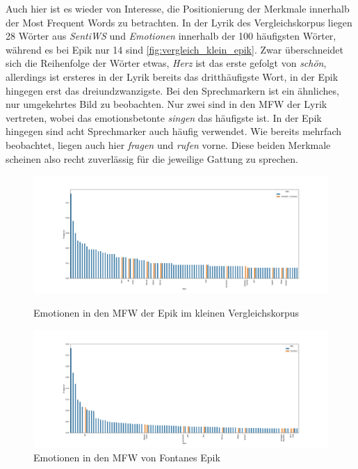 \documentclass[a4paper,10p]{article}
\begin{document}
Auch hier ist es wieder von Interesse, die Positionierung der Merkmale innerhalb der Most Frequent Words zu betrachten. In der Lyrik des Vergleichskorpus liegen 28 Wörter aus \textit{SentiWS} und \textit{Emotionen} innerhalb der 100 häufigsten Wörter, während es bei Epik nur 14 sind \ref{fig:vergleich_klein_epik}. Zwar überschneidet sich die Reihenfolge der Wörter etwas, \textit{Herz} ist das erste gefolgt von \textit{schön}, allerdings ist ersteres in der Lyrik bereits das dritthäufigste Wort, in der Epik hingegen erst das dreiundzwanzigste. Bei den Sprechmarkern ist ein ähnliches, nur umgekehrtes Bild zu beobachten. Nur zwei sind in den MFW der Lyrik vertreten, wobei das emotionsbetonte \textit{singen} das häufigste ist. In der Epik hingegen sind acht Sprechmarker auch häufig verwendet. Wie bereits mehrfach beobachtet, liegen auch hier \textit{fragen} und \textit{rufen} vorne. Diese beiden Merkmale scheinen also recht zuverlässig für die jeweilige Gattung zu sprechen. \par 

\begin{figure}{}
	\centering
	\begin{minipage}[b]{.45\linewidth}
		\centering
		\includegraphics[width=\linewidth]{vergleich_epik_sentiemo_mfw.png}
		\caption{Emotionen in den MFW der Epik im kleinen Vergleichskorpus}
		\label{vergleich_klein_epik}
	\end{minipage}
	\hfill
	\begin{minipage}[b]{.45\linewidth}
		\centering
		\includegraphics[width=\linewidth]{fontane_epik_sentiws+emotion_mfw.png}
		\caption{Emotionen in den MFW von Fontanes Epik} 
		\label{fonane_epik}
	\end{minipage}
\end{figure}
\end{document}
